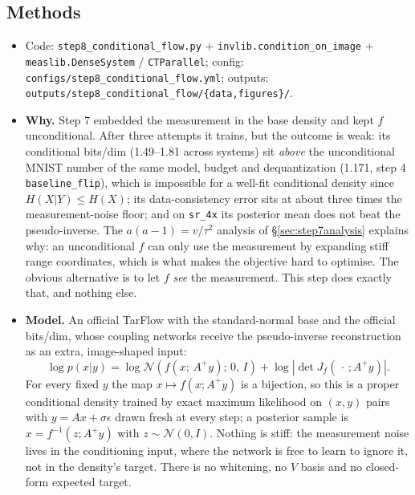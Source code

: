 \documentclass[11pt]{article}
\begin{document}
\subsection{Methods}
\begin{itemize}
  \item Code: \texttt{step8\_conditional\_flow.py} +
        \texttt{invlib.condition\_on\_image} + \texttt{measlib.DenseSystem} /
        \texttt{CTParallel}; config: \texttt{configs/step8\_conditional\_flow.yml};
        outputs: \texttt{outputs/step8\_conditional\_flow/\{data,figures\}/}.
  \item \textbf{Why.} Step 7 embedded the measurement in the base density and
        kept $f$ unconditional. After three attempts it trains, but the
        outcome is weak: its conditional bits/dim (1.49--1.81 across systems)
        sit \emph{above} the unconditional MNIST number of the same model,
        budget and dequantization (1.171, step 4 \texttt{baseline\_flip}),
        which is impossible for a well-fit conditional density since
        $H(X|Y) \le H(X)$; its data-consistency error sits at about three
        times the measurement-noise floor; and on \texttt{sr\_4x} its
        posterior mean does not beat the pseudo-inverse. The
        $a(a-1) = v/\tau^2$ analysis of \S\ref{sec:step7analysis} explains
        why: an unconditional $f$ can only use the measurement by expanding
        stiff range coordinates, which is what makes the objective hard to
        optimise. The obvious alternative is to let $f$ \emph{see} the
        measurement. This step does exactly that, and nothing else.
  \item \textbf{Model.} An official TarFlow with the standard-normal base
        and the official bits/dim, whose coupling networks receive the
        pseudo-inverse reconstruction as an extra, image-shaped input:
        \[
          \log p(x|y) = \log \mathcal{N}\!\left(f(x;\,A^{+}y);\,0,\,I\right)
                        + \log\left|\det J_f(\,\cdot\,;A^{+}y)\right| .
        \]
        For every fixed $y$ the map $x \mapsto f(x; A^{+}y)$ is a bijection,
        so this is a proper conditional density trained by exact maximum
        likelihood on $(x, y)$ pairs with $y = Ax + \sigma\epsilon$ drawn fresh
        at every step; a posterior sample is $x = f^{-1}(z; A^{+}y)$ with
        $z \sim \mathcal{N}(0, I)$. Nothing is stiff: the measurement noise
        lives in the conditioning input, where the network is free to learn
        to ignore it, not in the density's target. There is no whitening,
        no $V$ basis and no closed-form expected target.

\end{itemize}
\end{document}
